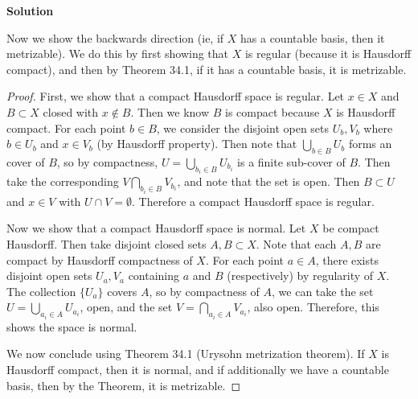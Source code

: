 \documentclass[12pt]{article}
\newcounter{AnswerCounter}
\newcounter{SubAnswerCounter}
\newenvironment{answer}[0]{
  \setcounter{SubAnswerCounter}{1}
  \bigskip
  \textbf{Solution \arabic{AnswerCounter}}
  \\
  \begin{small}
}{
  \end{small}
  \stepcounter{AnswerCounter}
}
\begin{document}
\begin{answer}[Page 218, \#3]
Now we show the backwards direction (ie, if $X$ has a countable basis, then it metrizable). We do this by first showing that $X$ is regular (because it is Hausdorff compact), and then by Theorem 34.1, if it has a countable basis, it is metrizable.
\begin{proof}
First, we show that a compact Hausdorff space is regular. Let $x \in X$ and $B \subset X$ closed with $x \notin B$. Then we know $B$ is compact because $X$ is Hausdorff compact. For each point $b \in B$, we consider the disjoint open sets $U_b, V_b$ where $b \in U_b$ and $x \in V_b$ (by Hausdorff property). Then note that $\bigcup_{b \in B} U_b$ forms an cover of $B$, so by compactness, $U = \bigcup_{b_i \in B} U_{b_i}$ is a finite sub-cover of $B$. Then take the corresponding $V \bigcap_{b_i \in B}V_{b_i}$, and note that the set is open. Then $B \subset U$ and $x \in V$ with $U \cap V = \emptyset$. Therefore a compact Hausdorff space is regular.

Now we show that a compact Hausdorff space is normal. Let $X$ be compact Hausdorff. Then take disjoint closed sets $A, B \subset X$. Note that each $A,B$ are compact by Hausdorff compactness of $X$. For each point $a \in A$, there exists disjoint open sets $U_a, V_a$ containing $a$ and $B$ (respectively) by regularity of $X$. The collection $\{U_a\}$ covers $A$, so by compactness of $A$, we can take the set $U = \bigcup_{a_i \in A} U_{a_i}$, open, and the set $V = \bigcap_{a_i \in A} V_{a_i}$, also open. Therefore, this shows the space is normal.

We now conclude using Theorem 34.1 (Urysohn metrization theorem). If $X$ is Hausdorff compact, then it is normal, and if additionally we have a countable basis, then by the Theorem, it is metrizable.
\end{proof}
\end{answer}
\end{document}
